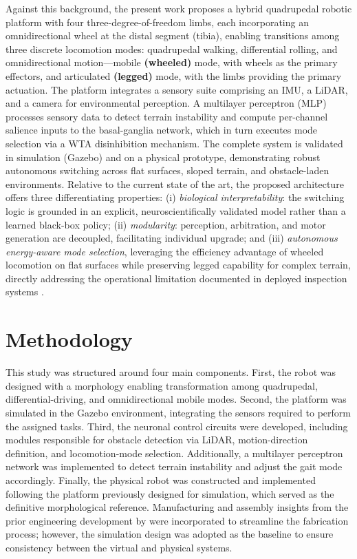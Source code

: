 \documentclass[preprint,12pt]{elsarticle}
\begin{document}
Against this background, the present work proposes a hybrid quadrupedal robotic platform with four three-degree-of-freedom limbs, each incorporating an omnidirectional wheel at the distal segment (tibia), enabling transitions among three discrete locomotion modes: quadrupedal walking, differential rolling, and omnidirectional motion---mobile \textbf{(wheeled)} mode, with wheels as the primary effectors, and articulated \textbf{(legged)} mode, with the limbs providing the primary actuation. The platform integrates a sensory suite comprising an IMU, a LiDAR, and a camera for environmental perception. A multilayer perceptron (MLP) processes sensory data to detect terrain instability and compute per-channel salience inputs to the basal-ganglia network, which in turn executes mode selection via a WTA disinhibition mechanism. The complete system is validated in simulation (Gazebo) and on a physical prototype, demonstrating robust autonomous switching across flat surfaces, sloped terrain, and obstacle-laden environments. Relative to the current state of the art, the proposed architecture offers three differentiating properties: (i) \emph{biological interpretability}: the switching logic is grounded in an explicit, neuroscientifically validated model rather than a learned black-box policy; (ii) \emph{modularity}: perception, arbitration, and motor generation are decoupled, facilitating individual upgrade; and (iii) \emph{autonomous energy-aware mode selection}, leveraging the efficiency advantage of wheeled locomotion on flat surfaces while preserving legged capability for complex terrain, directly addressing the operational limitation documented in deployed inspection systems \citep{Hutter2017ANYmal,Tranzatto2022CERBERUS}.


\section{Methodology}

This study was structured around four main components. First, the robot was designed with a morphology enabling transformation among quadrupedal, differential-driving, and omnidirectional mobile modes. Second, the platform was simulated in the Gazebo environment, integrating the sensors required to perform the assigned tasks. Third, the neuronal control circuits were developed, including modules responsible for obstacle detection via LiDAR, motion-direction definition, and locomotion-mode selection. Additionally, a multilayer perceptron network was implemented to detect terrain instability and adjust the gait mode accordingly. Finally, the physical robot was constructed and implemented following the platform previously designed for simulation, which served as the definitive morphological reference. Manufacturing and assembly insights from the prior engineering development by \citet{Grajales_Des_2025} were incorporated to streamline the fabrication process; however, the simulation design was adopted as the baseline to ensure consistency between the virtual and physical systems. 
\end{document}
